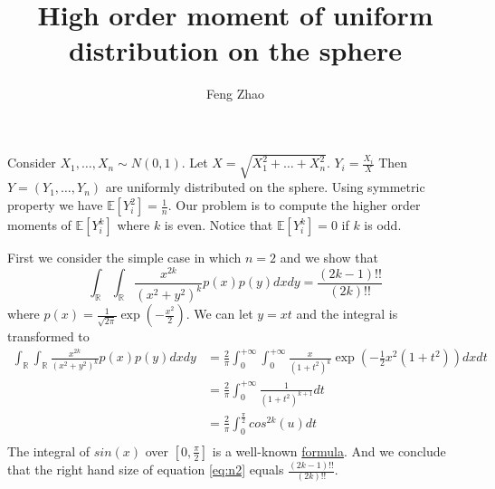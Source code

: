 \documentclass{article}
\title{High order moment of uniform distribution on the sphere}
\author{Feng Zhao}
\def\E{\mathbb{E}}
\def\R{\mathbb{R}}
\begin{document}
\maketitle
Consider $X_1, \dots, X_n \sim N(0, 1)$. Let $X = \sqrt{X_1^2 + \dots + X_n^2}$.
$Y_i = \frac{X_i}{X}$ Then $Y=(Y_1, \dots, Y_n)$ are uniformly distributed on the sphere.
Using symmetric property we have $\E[Y_i^2] = \frac{1}{n}$. Our problem is to compute the higher order moments of $\E[Y_i^k]$ where $k$ is even. Notice that $\E[Y_i^k]=0$ if $k$ is odd.

First we consider the simple case in which $n=2$ and we show that 
\begin{equation}\label{eq:n2}
\int_{\R}\int_{\R} \frac{x^{2k}}{(x^2+y^2)^k} p(x)p(y)dxdy = \frac{(2k-1)!!}{(2k)!!}
\end{equation}
where $p(x) = \frac{1}{\sqrt{2\pi}} \exp(-\frac{x^2}{2})$.
We can let $y=xt$ and the integral is transformed to 
\begin{align*}
\int_{\R}\int_{\R} \frac{x^{2k}}{(x^2+y^2)^k} p(x)p(y)dxdy & =
\frac{2}{\pi}\int_{0}^{+\infty}\int_{0}^{+\infty} \frac{x}{(1+t^2)^k} \exp(-\frac{1}{2}x^2(1+t^2))dxdt \\
&= 
\frac{2}{\pi}\int_{0}^{+\infty} \frac{1}{(1+t^2)^{k+1}}dt \\
&= \frac{2}{\pi}\int_{0}^{\frac{\pi}{2}} cos^{2k}(u)dt \\
\end{align*}
The integral of $sin(x)$ over $[0, \frac{\pi}{2}]$ is a well-known \href{https://math.stackexchange.com/questions/50447/integration-of-powers-of-the-sin-x}{formula}. And we conclude that the right hand size of equation \eqref{eq:n2} equals
$\frac{(2k-1)!!}{(2k)!!}$.
\end{document}

